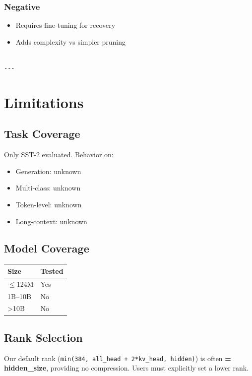 \subsubsection{Negative}
\begin{itemize}
\item Requires fine-tuning for recovery
\item Adds complexity vs simpler pruning
\end{itemize}
\begin{lstlisting}

---
\end{lstlisting}

\section{Limitations}

\subsection{Task Coverage}

Only SST-2 evaluated. Behavior on:
\begin{itemize}
\item Generation: unknown
\item Multi-class: unknown
\item Token-level: unknown
\item Long-context: unknown

\end{itemize}
\subsection{Model Coverage}

\begin{table}[H]
\centering
\small
\begin{tabular}{ll}
\toprule
\textbf{Size} & \textbf{Tested} \\
\midrule
$\le$124M & Yes \\
1B--10B & No \\
>10B & No \\
\bottomrule
\end{tabular}
\end{table}

\subsection{Rank Selection}

Our default rank (\texttt{min(384, all\_head + 2*kv\_head, hidden)}) is often 
\textbf{= hidden\_size}, providing no compression. Users must explicitly set a 
lower rank.

